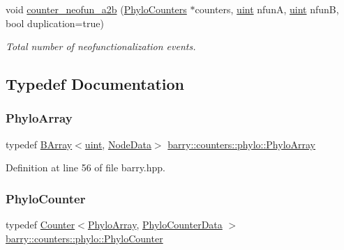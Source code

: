 \begin{Indent}
\begin{DoxyCompactItemize}
void \hyperlink{namespacebarry_1_1counters_1_1phylo_a3394895262bbf1fd603193ef21b9ddb8}{counter\+\_\+neofun\+\_\+a2b} (\hyperlink{namespacebarry_1_1counters_1_1phylo_a4e401ffe66d04091343dcffaf915f8c3}{Phylo\+Counters} $\ast$counters, \hyperlink{namespacebarry_a11dfc53ddb4672278319aa04f1e09a6c}{uint} nfunA, \hyperlink{namespacebarry_a11dfc53ddb4672278319aa04f1e09a6c}{uint} nfunB, bool duplication=true)
\begin{DoxyCompactList}\small\item\em Total number of neofunctionalization events. \end{DoxyCompactList}\end{DoxyCompactItemize}
\end{Indent}


\subsection{Typedef Documentation}
\mbox{\label{namespacebarry_1_1counters_1_1phylo_abd293bf65e494e903639fb5fb2c91604}} 
\subsubsection{\texorpdfstring{Phylo\+Array}{PhyloArray}}
{\footnotesize\ttfamily typedef \hyperlink{classbarry_1_1_b_array}{B\+Array}$<$\hyperlink{namespacebarry_a11dfc53ddb4672278319aa04f1e09a6c}{uint}, \hyperlink{classbarry_1_1counters_1_1phylo_1_1_node_data}{Node\+Data}$>$ \hyperlink{namespacebarry_1_1counters_1_1phylo_abd293bf65e494e903639fb5fb2c91604}{barry\+::counters\+::phylo\+::\+Phylo\+Array}}



Definition at line 56 of file barry.\+hpp.

\mbox{\label{namespacebarry_1_1counters_1_1phylo_a6523924ce3465c5b212584c57664f953}} 
\subsubsection{\texorpdfstring{Phylo\+Counter}{PhyloCounter}}
{\footnotesize\ttfamily typedef \hyperlink{classbarry_1_1_counter}{Counter}$<$\hyperlink{namespacebarry_1_1counters_1_1phylo_abd293bf65e494e903639fb5fb2c91604}{Phylo\+Array}, \hyperlink{namespacebarry_1_1counters_1_1phylo_a6ecc0d8ab76f8dc2db152221a8e9e95a}{Phylo\+Counter\+Data} $>$ \hyperlink{namespacebarry_1_1counters_1_1phylo_a6523924ce3465c5b212584c57664f953}{barry\+::counters\+::phylo\+::\+Phylo\+Counter}}



